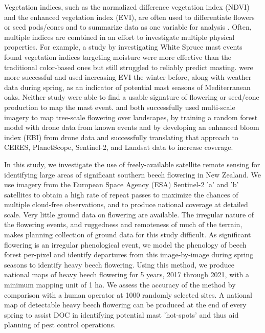 \documentclass[remotesensing,article,submit,moreauthors,pdftex]{Definitions/mdpi}
\begin{document}
Vegetation indices, such as the normalized difference vegetation index (NDVI) and the enhanced vegetation index (EVI), are often used to differentiate flowers or seed pods/cones and to summarize data as one variable for analysis \citep{Marcos2015,Chen2019,Dixon2021,Noumonvi2021}. Often, multiple indices are combined in an effort to investigate multiple physical properties. For example, a study by \citet{Garcia2021} investigating White Spruce mast events found vegetation indices targeting moisture were more effective than the traditional color-based ones but still struggled to reliably predict masting. \citet{Marcos2015} were more successful and used increasing EVI the winter before, along with weather data during spring, as an indicator of potential mast seasons of Mediterranean oaks. Neither study were able to find a usable signature of flowering or seed/cone production to map the mast event. \citet{Dixon2021} and \citet{Chen2019} both successfully used multi-scale imagery to map tree-scale flowering over landscapes, \citet{Dixon2021} by training a random forest model with drone data from known events and \citet{Chen2019} by developing an enhanced bloom index (EBI) from drone data and successfully translating that approach to CERES, PlanetScope, Sentinel-2, and Landsat data to increase coverage.

In this study, we investigate the use of freely-available satellite remote sensing for identifying large areas of significant southern beech flowering in New Zealand. We use imagery from the European Space Agency (ESA) Sentinel-2 'a' and 'b' satellites to obtain a high rate of repeat passes to maximize the chances of multiple cloud-free observations, and to produce national coverage at detailed scale. Very little ground data on flowering are available. The irregular nature of the flowering events, and ruggedness and remoteness of much of the terrain, makes planning collection of ground data for this study difficult. As significant flowering is an irregular phenological event, we model the phenology of beech forest per-pixel and identify departures from this image-by-image during spring seasons to identify heavy beech flowering. Using this method, we produce national maps of heavy beech flowering for 5 years, 2017 through 2021, with a minimum mapping unit of 1 ha. We assess the accuracy of the method by comparison with a human operator at 1000 randomly selected sites. A national map of detectable heavy beech flowering can be produced at the end of every spring to assist DOC in identifying potential mast 'hot-spots' and thus aid planning of pest control operations. 
 
\end{document}

